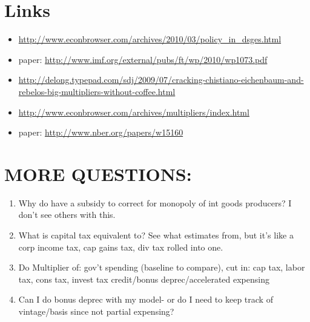 \documentclass[article,11pt,letterpaper,fleqn]{article}
\theoremstyle{definition}
\numberwithin{equation}{section}
\newcommand{\cn}{\citeasnoun} %
\begin{document}
{\section{Links}
\begin{itemize}
\item \url{http://www.econbrowser.com/archives/2010/03/policy_in_dsges.html}
\item \cn{IMF2010} paper: \url{http://www.imf.org/external/pubs/ft/wp/2010/wp1073.pdf}
\item \url{http://delong.typepad.com/sdj/2009/07/cracking-chistiano-eichenbaum-and-rebelos-big-multipliers-without-coffee.html}
\item \url{http://www.econbrowser.com/archives/multipliers/index.html}
\item \cn{TY2010} paper: \url{http://www.nber.org/papers/w15160}
\end{itemize}




\section{MORE QUESTIONS:}
\begin{enumerate}
\item Why do \cn{CER2010} have a subsidy to correct for monopoly of int goods producers?  I don't see others with this.
\item What is capital tax equivalent to?  See what \cn{Zubairy2010} estimates from, but it's like a corp income tax, cap gains tax, div tax rolled into one.
\item Do Multiplier of: gov't spending (baseline to compare), cut in: cap tax, labor tax, cons tax, invest tax credit/bonus deprec/accelerated expensing
\item Can I do bonus deprec with my model- or do I need to keep track of vintage/basis since not partial expensing?
\end{enumerate}

\newpage





\newpage
\renewcommand{\theequation}{T.\arabic{section}.\arabic{equation}}
\renewcommand{\thesection}{T-\arabic{section}}   %
\setcounter{equation}{0}                         %
\setcounter{section}{0}                          %
}
\end{document}

